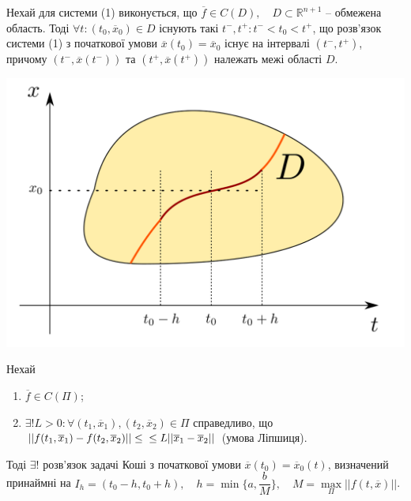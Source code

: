 \documentclass[14pt,a4paper]{scrartcl}
\theoremstyle{definition}
\theoremstyle{remark}
\theoremstyle{definition}
\theoremstyle{definition}
\begin{document}
\begin{boxteo}
Нехай для системи (1) виконується, що $\overline{f} \in C(D), \quad D \subset \mathbb{R}^{n + 1}$ -- обмежена область. Тоді $\forall t : (t_0, \overline{x}_0) \in D$ існують такі $t^{-}, t^{+} : t^{-} < t_0 < t^{+}$, що розв'язок системи (1) з початкової умови $\overline{x}(t_0) = \overline{x}_0$ існує на інтервалі $(t^{-}, t^{+})$, причому $(t^{-}, \overline{x}(t^{-})) \text{ та } (t^{+}, \overline{x}(t^{+}))$ належать межі області $D$.
    \begin{center} \includegraphics[scale=0.35]{assets/lect0.png} \end{center}
\end{boxteo}

\begin{boxteo}
  Нехай
  \begin{spacing}{1}
  \begin{enumerate}
    \item $\overline{f} \in C(\Pi)$;
    \item $\exists! L > 0 : \forall (t_1, \overline{x}_1), (t_2, \overline{x}_2) \in \Pi$ справедливо, що $|| f(t_1, \overline{x}_1) - f(t_2, \overline{x}_2)|| \leq \\ \leq L||\overline{x}_1 - \overline{x}_2||$ (умова Ліпшиця).
  \end{enumerate}
  \end{spacing}


  Тоді $\exists!$ розв'язок задачі Коші з початкової умови $\overline{x}(t_0) = \overline{x}_0(t)$, визначений принаймні на $I_h = (t_0 - h, t_0 + h), \quad h = \min\{{a, \dfrac{b}{M}}\}, \quad M = \max\limits_{\Pi}||f(t, \overline{x})||$.
\end{boxteo}
\end{document}
